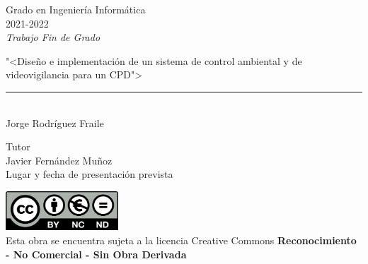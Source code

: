 \begin{titlepage}
	\begin{sffamily}
		\color{azulUC3M}
		\begin{center}
			\begin{figure}[H] %
				\label{fig:portadaLogo}
			\end{figure}
			\vspace{2.5cm}
			\begin{Large}
				Grado en Ingeniería Informática\\
				2021-2022\\
				\vspace{2cm}
				\textsl{Trabajo Fin de Grado}
				\bigskip
				
			\end{Large}
			{\Huge "<Diseño e implementación de un sistema de control ambiental y de videovigilancia para un CPD">}\\
			\vspace*{0.5cm}
			\rule{10.5cm}{0.1mm}\\
			\vspace*{0.9cm}
			{\LARGE Jorge Rodríguez Fraile}\\
			\vspace*{1cm}
			\begin{Large}
				Tutor\\
				Javier Fernández Muñoz\\
				Lugar y fecha de presentación prevista\\
			\end{Large}
		\end{center}
		\vfill
		\color{black}
		\includegraphics[width=4.2cm]{imagenes/creativecommons.jpg}\\ %
		Esta obra se encuentra sujeta a la licencia Creative Commons \textbf{Reconocimiento - No Comercial - Sin Obra Derivada}
	\end{sffamily}
\end{titlepage}